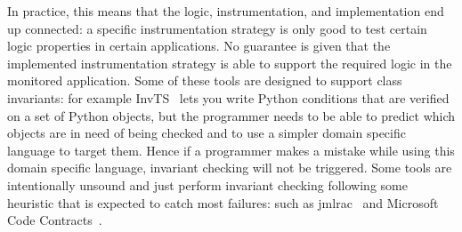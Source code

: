 In practice, this means that the logic, instrumentation, and implementation end up connected:
a specific instrumentation strategy is only good to test certain logic properties in certain applications.
No guarantee is given that the implemented instrumentation strategy is able to support the required logic in the monitored application.
Some of these tools are designed to support class invariants: for example InvTS~\cite{gorbovitski08efficient} lets you write Python conditions that are verified on a set of Python objects, but the programmer needs to be able
to predict which objects are in need of being checked and to use a simpler domain specific language to target them. Hence if a programmer makes a mistake while using this domain specific language, invariant checking
will not be triggered.
Some tools are intentionally unsound and just perform invariant checking following some heuristic that is expected to catch most failures: such as jmlrac~\cite{Burdy2005} and Microsoft Code Contracts~\cite{fahndrich2010embedded}.







%
%

